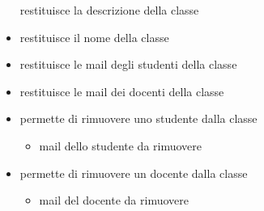 \begin{itemize}
\newline
restituisce la descrizione della classe
\newline
\item {}
\newline
restituisce il nome della classe
\newline
\item {}
\newline
restituisce le mail degli studenti della classe
\newline
\item {}
\newline
restituisce le mail dei docenti della classe
\newline
\item {}
\newline
permette di rimuovere uno studente dalla
classe
\newline
{}
\newline
\begin{itemize}
\item {}
\newline
mail dello studente da rimuovere
\end{itemize}
\item {}
\newline
permette di rimuovere un docente dalla
classe
\newline
{}
\newline
\begin{itemize}
\item {}
\newline
mail del docente da rimuovere
\end{itemize}
\end{itemize}
